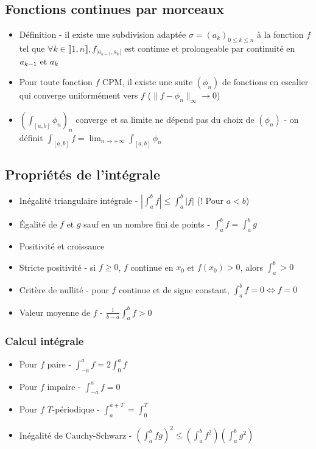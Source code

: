 \documentclass[openany]{book}
\begin{document}
\subsection{Fonctions continues par morceaux}
\begin{itemize}
    \item Définition - il existe une subdivision adaptée $\sigma = (a_k)_{0\leq k \leq n}$ à la fonction $f$ tel que $\forall k \in \llbracket 1, n \rrbracket, f_{] a_{k-1}, a_k [}$ est continue et prolongeable par continuité en $a_{k-1} \text{ et } a_{k}$
    \item Pour toute fonction $f$ CPM, il existe une suite $(\phi_n)$ de fonctions en escalier qui converge uniformément vers $f$ ($\| f - \phi_n \|_{\infty} \longrightarrow 0$)
    \item $(\int_{[a, b]} \phi_n)_n$ converge et sa limite ne dépend pas du choix de $(\phi_n)$ - on définit $\int_{[a, b]} f = \lim_{n \rightarrow +\infty} \int_{[a, b]} \phi_n$
\end{itemize}

\subsection{Propriétés de l'intégrale}
\begin{itemize}
    \item Inégalité triangulaire intégrale - $ |\int_{a}^{b} f| \leq \int_{a}^{b} |f| $ (! Pour $a < b$)
    \item Égalité de $f$ et $g$ sauf en un nombre fini de points - $\int_a^b f = \int_a^b g$
    \item Positivité et croissance
    \item Stricte positivité - si $f \geq 0$, $f$ continue en $x_0$ et $f(x_0) > 0$, alors $\int_{a}^{b} > 0$
    \item Critère de nullité - pour $f$ continue et de signe constant, $\int_{a}^{b} f = 0 \iff f = 0$
    \item Valeur moyenne de $f$ - $\frac{1}{b-a}\int_{a}^{b} f > 0$
\end{itemize}

\subsubsection{Calcul intégrale}
\begin{itemize}
    \item Pour $f$ paire - $\int_{-a}^a f = 2 \int_0^a f$
    \item Pour $f$ impaire - $\int_{-a}^a f = 0$
    \item Pour $f$ $T$-périodique - $\int_{a}^{a+T} = \int_{0}^{T}$
    \item Inégalité de Cauchy-Schwarz - $(\int_{a}^{b} fg)^2 \leq (\int_{a}^{b}f^2)(\int_{a}^{b}g^2)$
\end{itemize}
\end{document}
